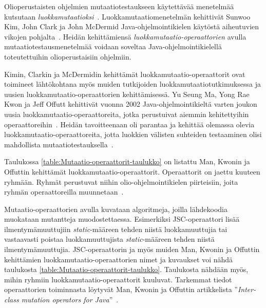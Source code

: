 \documentclass[finnish, grading]{tktltiki2}
\theoremstyle{definition}
\theoremstyle{remark}
\begin{document}
Olioperustaisten ohjelmien mutaatiotestaukseen käytettävää menetelmää kutsutaan \textit{luokkamutaatioksi}~\cite{Kim:Clark:McDermid:2000}. Luokkamutaatiomenetelmän kehittivät Sunwoo Kim, John Clark ja John McDermid Java-oh\-jel\-moin\-ti\-kie\-len käytöstä aiheutuvien vikojen pohjalta~\cite{Kim:Clark:McDermid:2000}. Heidän kehittämiensä \textit{luokkamutaatio-operaattorien} avulla mutaatiotestausmenetelmää voidaan soveltaa Java-ohjelmointikielellä toteutettuihin olioperustaisiin ohjelmiin.

Kimin, Clarkin ja McDermidin kehittämät luokkamutaatio-operaattorit ovat toimineet lähtökohtana myös muiden tutkijoiden luokkamutaatiotutkimuksessa ja uusien luokkamutaatio-operaattorien kehittämisessä. Yu Seung Ma, Yong Rae Kwon ja Jeff Offutt kehittivät vuonna 2002 Java-oh\-jel\-moin\-ti\-kiel\-tä varten joukon uusia luokkamutaatio-operaattoreita, jotka perustuivat aiemmin kehitettyihin operaattoreihin~\cite[s. 352]{Ma:Kwon:Offutt:2002}. Heidän tavoitteenaan oli parantaa ja kehittää olemassa olevia luokkamutaatio-operaattoreita, jotta luokkien välisten suhteiden testaaminen olisi mahdollista mutaatiotestauksella~\cite[s. 362]{Ma:Kwon:Offutt:2002}.

Taulukossa \ref{table:Mutaatio-operaattorit-taulukko} on listattu Man, Kwonin ja Offuttin kehittämät luok\-ka\-mu\-taa\-ti\-o-o\-pe\-raat\-to\-rit. Operaattorit on jaettu kuuteen ryhmään. Ryhmät perustuvat niihin olio-ohjelmointikielen piirteisiin, joita ryhmän operaattoreilla muunnetaan~\cite[s. 355]{Ma:Kwon:Offutt:2002}.

Mutaatio-operaattorien avulla kuvataan algoritmeja, joilla lähdekoodia muokataan mutantteja muodostettaessa. Esimerkiksi JSC-operaattori lisää ilmentymämuuttujiin \textit{static}-määreen tehden niistä luokkamuuttujia tai vastaavasti poistaa luokkamuuttujista \textit{static}-määreen tehden niistä ilmentymämuuttujia. JSC-operaattorin ja myös muiden Man, Kwonin ja Offuttin kehittämien luokkamutaatio-operaattorien nimet ja kuvaukset voi nähdä taulukosta \ref{table:Mutaatio-operaattorit-taulukko}. Taulukosta nähdään myös, mihin ryhmiin luokkamutaatio-operaattorit kuuluvat. Tarkemmat tiedot operaattorien toiminnasta löytyvät Man, Kwonin ja Offuttin artikkelista ''\textit{Inter-class mutation operators for Java}''~\cite{Ma:Kwon:Offutt:2002}. 
\end{document}
